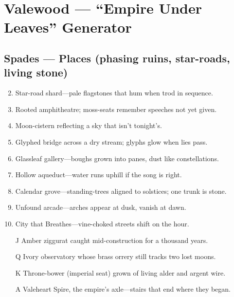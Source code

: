 \chapter{Valewood --- ``Empire Under Leaves'' Generator}
\label{chap:valewood}

\section*{Spades --- Places (phasing ruins, star-roads, living stone)}
\label{sec:valewood-places}
\begin{enumerate}
\setcounter{enumi}{1}
\item Star-road shard---pale flagstones that hum when trod in sequence.
\item Rooted amphitheatre; moss-seats remember speeches not yet given.
\item Moon-cistern reflecting a sky that isn't tonight's.
\item Glyphed bridge across a dry stream; glyphs glow when lies pass.
\item Glassleaf gallery---boughs grown into panes, dust like constellations.
\item Hollow aqueduct---water runs uphill if the song is right.
\item Calendar grove---standing-trees aligned to solstices; one trunk is stone.
\item Unfound arcade---arches appear at dusk, vanish at dawn.
\item City that Breathes---vine-choked streets shift on the hour.
\item[J] Amber ziggurat caught mid-construction for a thousand years.
\item[Q] Ivory observatory whose brass orrery still tracks two lost moons.
\item[K] Throne-bower (imperial seat) grown of living alder and argent wire.
\item[A] Valeheart Spire, the empire's axle---stairs that end where they began.
\end{enumerate}

